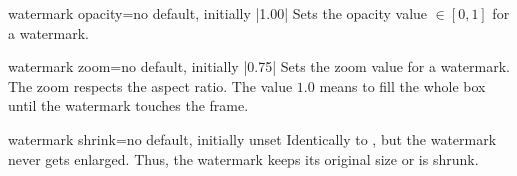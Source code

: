 \begin{docTcbKey}{watermark opacity}{=}{no default, initially |1.00|}
Sets the opacity value $\in[0,1]$ for a watermark.
\begin{dispExample}

\begin{tcolorbox}[title=Opacity 1.00,watermark opacity=1.00]
\lipsum[2]
\end{tcolorbox}\hfill%
\begin{tcolorbox}[title=Opacity 0.50,watermark opacity=0.50]
\lipsum[2]
\end{tcolorbox}%
\end{dispExample}
\end{docTcbKey}

\enlargethispage*{1cm}

\begin{docTcbKey}{watermark zoom}{=}{no default, initially |0.75|}
Sets the zoom value for a watermark. The zoom respects the aspect ratio.
The value $1.0$ means to fill the whole box until the watermark touches the frame.
\begin{dispExample}

\begin{tcolorbox}[title=Zoom 1.0,watermark zoom=1.0]
\lipsum[2]
\end{tcolorbox}\hfill%
\begin{tcolorbox}[title=Zoom 0.5,watermark zoom=0.5]
\lipsum[2]
\end{tcolorbox}%
\end{dispExample}
\end{docTcbKey}


\begin{docTcbKey}{watermark shrink}{=}{no default, initially unset}
Identically to , but the watermark
never gets enlarged. Thus, the watermark keeps its original size or is shrunk.
\end{docTcbKey}


